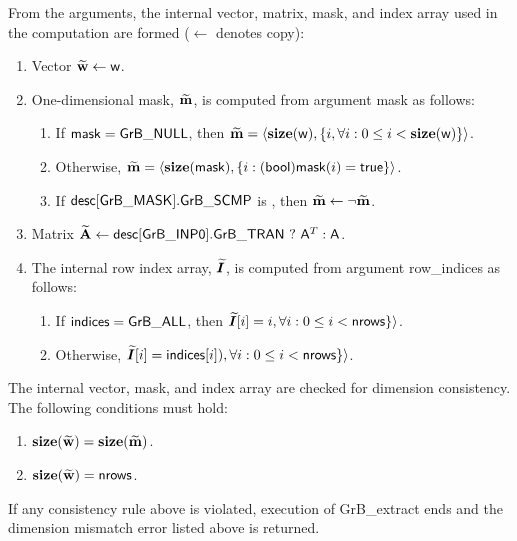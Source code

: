 From the arguments, the internal vector, matrix, mask, and index array used in 
the computation are formed ($\leftarrow$ denotes copy):
\begin{enumerate}
	\item Vector ${\bf \widetilde{w}} \leftarrow {\sf w}$.

	\item One-dimensional mask, ${\bf \widetilde{m}}$, is computed from 
    argument {\sf mask} as follows:
	\begin{enumerate}
		\item	If ${\sf mask} = {\sf GrB\_NULL}$, then ${\bf \widetilde{m}} = 
        \langle \bold{size}({\sf w}), \{i, \forall i : 0 \leq i < 
        \bold{size}({\sf w}) \} \rangle$.

		\item	Otherwise, ${\bf \widetilde{m}} = 
        \langle \bold{size}({\sf mask}), \{i : ({\sf bool}){\sf mask}(i) = 
        {\sf true}\} \rangle$.

		\item	If ${\sf desc[GrB\_MASK].GrB\_SCMP}$ is \true, then 
        ${\bf \widetilde{m}} \leftarrow \neg {\bf \widetilde{m}}$.
	\end{enumerate}

	\item Matrix ${\bf \widetilde{A}} \leftarrow 
    {\sf desc[GrB\_INP0].GrB\_TRAN} \ ? \ {\sf A}^T : {\sf A}$.
    
    \item The internal row index array, $\bm{\widetilde{I}}$, is computed from 
    argument {\sf row\_indices} as follows:
	\begin{enumerate}
		\item	If ${\sf indices} = {\sf GrB\_ALL}$, then 
        $\bm{\widetilde{I}}[i] = i, \forall i : 0 \leq i < {\sf nrows} \}
        \rangle$.

		\item	Otherwise, $\bm{\widetilde{I}}[i] = {\sf indices}[i]), 
        \forall i : 0 \leq i < {\sf nrows} \} \rangle$.
    \end{enumerate}
\end{enumerate}

The internal vector, mask, and index array are checked for dimension 
consistency.  The following conditions must hold:
\begin{enumerate}
	\item $\bold{size}({\bf \widetilde{w}}) = \bold{size}({\bf \widetilde{m}})$.

	\item $\bold{size}({\bf \widetilde{w}}) = {\sf nrows}$.
\end{enumerate}
If any consistency rule above is violated, execution of {\sf GrB\_extract} ends 
and the dimension mismatch error listed above is returned.

